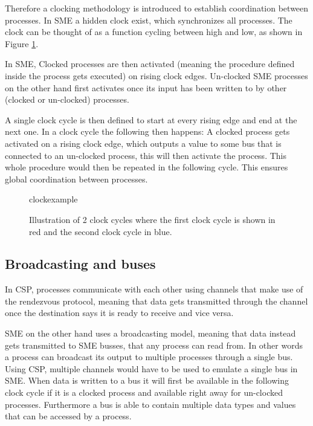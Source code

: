         Therefore a clocking methodology is introduced to establish coordination between processes. In SME a hidden clock exist, which synchronizes all processes. The clock can be thought of as a function cycling between high and low, as shown in Figure \ref{fig:clockexample}. 
        
        In SME, Clocked processes are then activated (meaning the procedure defined inside the process gets executed) on rising clock edges. Un-clocked SME processes on the other hand first activates once its input has been written to by other (clocked or un-clocked) processes. 
        
        A single clock cycle is then defined to start at every rising edge and end at the next one. In a clock cycle the following then happens: A clocked process gets activated on a rising clock edge, which outputs a value to some bus that is connected to an un-clocked process, this will then activate the process. This whole procedure would then be repeated in the following cycle. This ensures global coordination between processes.
        
        \begin{figure}[h!]
            \centering
            {clockexample}
            \caption{Illustration of 2 clock cycles where the first clock cycle is shown in red and the second clock cycle in blue.}
            \label{fig:clockexample}
        \end{figure}
    
    \subsection{Broadcasting and buses}
        In CSP, processes communicate with each other using channels that make use of the rendezvous protocol, meaning that data gets transmitted through the channel once the destination says it is ready to receive and vice versa. 
        
        SME on the other hand uses a broadcasting model, meaning that data instead gets transmitted to SME busses, that any process can read from. In other words a process can broadcast its output to multiple processes through a single bus. Using CSP, multiple channels would have to be used to emulate a single bus in SME. When data is written to a bus it will first be available in the following clock cycle if it is a clocked process and available right away for un-clocked processes. Furthermore a bus is able to contain multiple data types and values that can be accessed by a process. 
        
